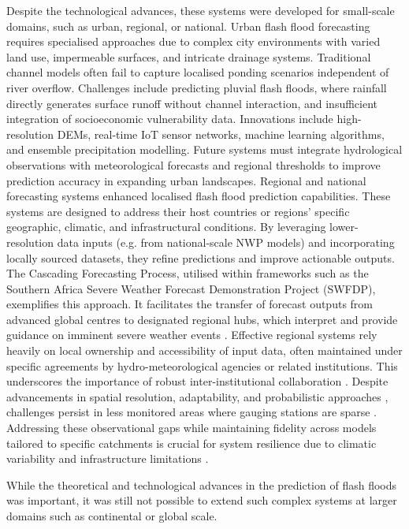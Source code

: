 Despite the technological advances, these systems were developed for small-scale domains, such as urban, regional, or national. Urban flash flood forecasting requires specialised approaches due to complex city environments with varied land use, impermeable surfaces, and intricate drainage systems. Traditional channel models often fail to capture localised ponding scenarios independent of river overflow. Challenges include predicting pluvial flash floods, where rainfall directly generates surface runoff without channel interaction, and insufficient integration of socioeconomic vulnerability data. Innovations include high-resolution DEMs, real-time IoT sensor networks, machine learning algorithms, and ensemble precipitation modelling. Future systems must integrate hydrological observations with meteorological forecasts and regional thresholds to improve prediction accuracy in expanding urban landscapes. Regional and national forecasting systems enhanced localised flash flood prediction capabilities. These systems are designed to address their host countries or regions' specific geographic, climatic, and infrastructural conditions. By leveraging lower-resolution data inputs (e.g. from national-scale NWP models) and incorporating locally sourced datasets, they refine predictions and improve actionable outputs. The Cascading Forecasting Process, utilised within frameworks such as the Southern Africa Severe Weather Forecast Demonstration Project (SWFDP), exemplifies this approach. It facilitates the transfer of forecast outputs from advanced global centres to designated regional hubs, which interpret and provide guidance on imminent severe weather events \citep{Jubach2016}. Effective regional systems rely heavily on local ownership and accessibility of input data, often maintained under specific agreements by hydro-meteorological agencies or related institutions. This underscores the importance of robust inter-institutional collaboration \citep{Georgakakos_2022}. Despite advancements in spatial resolution, adaptability, and probabilistic approaches \citep{Zanchetta_2020, AlRawas_2024}, challenges persist in less monitored areas where gauging stations are sparse \citep{Kuksina_2020}. Addressing these observational gaps while maintaining fidelity across models tailored to specific catchments is crucial for system resilience due to climatic variability and infrastructure limitations \citep{Liu_2011, Douinot_2016}. 

While the theoretical and technological advances in the prediction of flash floods was important, it was still not possible to extend such complex systems at larger domains such as continental or global scale. 

